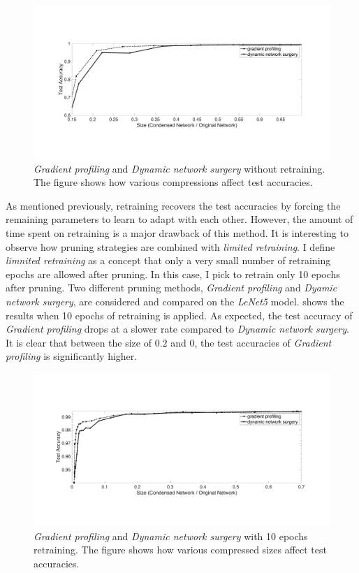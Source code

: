 \documentclass[a4paper,12pt]{report}
\begin{document}
\begin{figure}[!h]
  \centering
  \includegraphics[width=\textwidth]{gradient_profile_noretrain.pdf}
  \caption{\textit{Gradient profiling} and \textit{Dynamic network surgery}
  without retraining. The figure shows how various compressions affect test
  accuracies.}
  \label{fig:gpvsds_noretrain}
\end{figure}

As mentioned previously, retraining recovers the test accuracies by forcing
the remaining parameters to learn to adapt with each other.
However, the amount of time spent on retraining is a major drawback of this method.
It is interesting to observe how pruning strategies are combined with \textit{limited retraining}.
I define \textit{limnited retraining} as a concept that only a very small number
of retraining epochs are allowed after pruning.
In this case, I pick to retrain only 10 epochs after pruning.
Two different pruning methods, \textit{Gradient profiling} and
\textit{Dyamic network surgery}, are considered and compared on the \textit{LeNet5} model.
 shows the results when 10 epochs of retraining
is applied.
As expected, the test accuracy of \textit{Gradient profiling} drops at a slower
rate compared to \textit{Dynamic network surgery}.
It is clear that between the size of $0.2$ and $0$, the test accuracies of
\textit{Gradient profiling} is significantly higher.

\begin{figure}[!h]
  \centering
  \includegraphics[width=\textwidth]{gradient_profile_10epoch.pdf}
  \caption{\textit{Gradient profiling} and \textit{Dynamic network surgery}
  with 10 epochs retraining. The figure shows how various compressed sizes affect test
  accuracies.}
  \label{fig:gpvsds_10retrain}
\end{figure}
\end{document}
